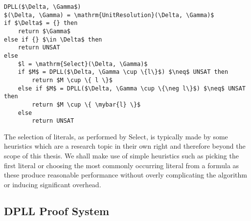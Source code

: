 \begin{lstlisting}[caption = Example DPLL Algorithm,mathescape, label = cl:dpllalg]
DPLL($\Delta, \Gamma$)
$(\Delta, \Gamma) = \mathrm{UnitResolution}(\Delta, \Gamma)$
if $\Delta$ = {} then
	return $\Gamma$
else if {} $\in \Delta$ then
	return UNSAT
else
	$l = \mathrm{Select}(\Delta, \Gamma)$
	if $M$ = DPLL($\Delta, \Gamma \cup \{l\}$) $\neq$ UNSAT then
		return $M \cup \{ l \}$ 
	else if $M$ = DPLL($\Delta, \Gamma \cup \{\neg l\}$) $\neq$ UNSAT then 
		return $M \cup \{ \mybar{l} \}$ 
	else
		return UNSAT
\end{lstlisting}

The selection of literals,  as performed by $\mathrm{Select}$, is typically made by some heuristics which are a research topic in their own right and therefore beyond the scope of this thesis. We shall make use of simple heuristics such as  picking the first literal  or choosing the most commonly occurring literal  from a formula as these produce reasonable performance without overly complicating the algorithm or inducing significant overhead.

\subsection*{DPLL Proof System}

